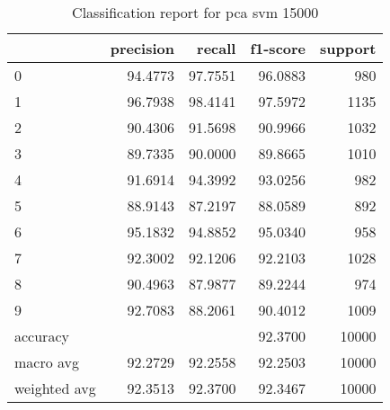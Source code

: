 \begin{table}[htb!]
\centering
\begin{tabular}{lrrrr}
    \toprule
    & precision & recall & f1-score & support \\
    \midrule
    0 & 94.4773 & 97.7551 & 96.0883 & 980 \\
    1 & 96.7938 & 98.4141 & 97.5972 & 1135 \\
    2 & 90.4306 & 91.5698 & 90.9966 & 1032 \\
    3 & 89.7335 & 90.0000 & 89.8665 & 1010 \\
    4 & 91.6914 & 94.3992 & 93.0256 & 982 \\
    5 & 88.9143 & 87.2197 & 88.0589 & 892 \\
    6 & 95.1832 & 94.8852 & 95.0340 & 958 \\
    7 & 92.3002 & 92.1206 & 92.2103 & 1028 \\
    8 & 90.4963 & 87.9877 & 89.2244 & 974 \\
    9 & 92.7083 & 88.2061 & 90.4012 & 1009 \\
    accuracy & & & 92.3700 & 10000 \\
    macro avg & 92.2729 & 92.2558 & 92.2503 & 10000 \\
    weighted avg & 92.3513 & 92.3700 & 92.3467 & 10000 \\
    \bottomrule
\end{tabular}
\caption{Classification report for pca svm 15000}
\label{tab:classification-report-pca_svm_15000}
\end{table}
